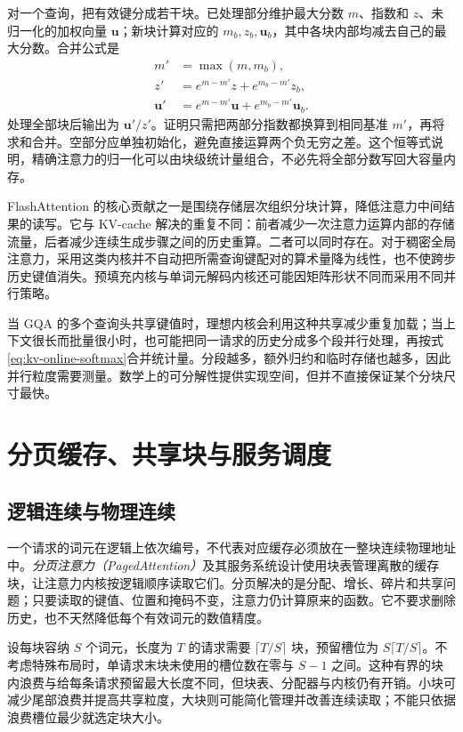 \documentclass[UTF8,12pt,a4paper,fontset=fandol]{ctexart}
\begin{document}
对一个查询，把有效键分成若干块。已处理部分维护最大分数 $m$、指数和 $z$、未归一化的加权向量 $\mathbf u$；新块计算对应的 $m_b,z_b,\mathbf u_b$，其中各块内部均减去自己的最大分数。合并公式是
\begin{equation}
 \begin{aligned}
 m'&=\max(m,m_b),\\
 z'&=e^{m-m'}z+e^{m_b-m'}z_b,\\
 \mathbf u'&=e^{m-m'}\mathbf u+e^{m_b-m'}\mathbf u_b.
 \end{aligned}
 \label{eq:kv-online-softmax}
\end{equation}
处理全部块后输出为 $\mathbf u'/z'$。证明只需把两部分指数都换算到相同基准 $m'$，再将求和合并。空部分应单独初始化，避免直接运算两个负无穷之差。这个恒等式说明，精确注意力的归一化可以由块级统计量组合，不必先将全部分数写回大容量内存。

FlashAttention 的核心贡献之一是围绕存储层次组织分块计算，降低注意力中间结果的读写\cite{flash}。它与 KV-cache 解决的重复不同：前者减少一次注意力运算内部的存储流量，后者减少连续生成步骤之间的历史重算。二者可以同时存在。对于稠密全局注意力，采用这类内核并不自动把所需查询键配对的算术量降为线性，也不使跨步历史键值消失。预填充内核与单词元解码内核还可能因矩阵形状不同而采用不同并行策略。

当 GQA 的多个查询头共享键值时，理想内核会利用这种共享减少重复加载；当上下文很长而批量很小时，也可能把同一请求的历史分成多个段并行处理，再按式\eqref{eq:kv-online-softmax}合并统计量。分段越多，额外归约和临时存储也越多，因此并行粒度需要测量。数学上的可分解性提供实现空间，但并不直接保证某个分块尺寸最快。

\section{分页缓存、共享块与服务调度}
\label{sec:kv-paging}

\subsection{逻辑连续与物理连续}

一个请求的词元在逻辑上依次编号，不代表对应缓存必须放在一整块连续物理地址中。\emph{分页注意力（PagedAttention）}及其服务系统设计使用块表管理离散的缓存块，让注意力内核按逻辑顺序读取它们\cite{paged}。分页解决的是分配、增长、碎片和共享问题；只要读取的键值、位置和掩码不变，注意力仍计算原来的函数。它不要求删除历史，也不天然降低每个有效词元的数值精度。

设每块容纳 $S$ 个词元，长度为 $T$ 的请求需要 $\lceil T/S\rceil$ 块，预留槽位为 $S\lceil T/S\rceil$。不考虑特殊布局时，单请求末块未使用的槽位数在零与 $S-1$ 之间。这种有界的块内浪费与给每条请求预留最大长度不同，但块表、分配器与内核仍有开销。小块可减少尾部浪费并提高共享粒度，大块则可能简化管理并改善连续读取；不能只依据浪费槽位最少就选定块大小。
\end{document}
